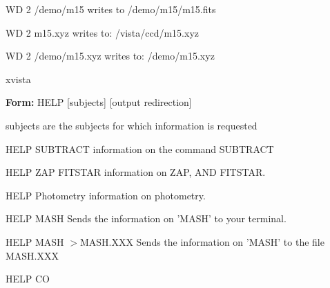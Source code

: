 {\newpage\clearpage
{}%
\begin{example}
   \item[WD 2 /demo/m15\hfill]{writes to /demo/m15/m15.fits}
   \item[WD 2 m15.xyz\hfill]{writes to: /vista/ccd/m15.xyz}
   \item[WD 2 /demo/m15.xyz\hfill]{writes to: /demo/m15.xyz}
\end{example}%
\lthtmlfigureZ
\lthtmlcheckvsize\clearpage}

{\newpage\clearpage
{}%
\begin{example}
   \item[xvista\hfill]{}
\end{example}%
\lthtmlfigureZ
\lthtmlcheckvsize\clearpage}

{\newpage\clearpage
{}%
\begin{command}
   \item[\textbf{Form: } HELP {[subjects]} {[output redirection]}\hfill]{}
   \item[subjects]{are the subjects for which information is requested}
\end{command}%
\lthtmlfigureZ
\lthtmlcheckvsize\clearpage}

{\newpage\clearpage
{}%
\begin{example}
   \item[HELP SUBTRACT \hfill]{information on the command SUBTRACT}
   \item[HELP ZAP FITSTAR \hfill]{information on ZAP, AND FITSTAR.}
   \item[HELP Photometry \hfill]{information on photometry.}
\end{example}%
\lthtmlfigureZ
\lthtmlcheckvsize\clearpage}

{\newpage\clearpage
{}%
\begin{example}
   \item[HELP MASH\hfill]{Sends the information on 'MASH'
        to your terminal.}
   \item[HELP MASH $>$MASH.XXX\hfill]{Sends the information on 'MASH'
        to the file MASH.XXX}
\end{example}%
\lthtmlfigureZ
\lthtmlcheckvsize\clearpage}

{\newpage\clearpage
{}%
\begin{hanging}
   \item{HELP CO}
\end{hanging}%
\lthtmlfigureZ
\lthtmlcheckvsize\clearpage}

